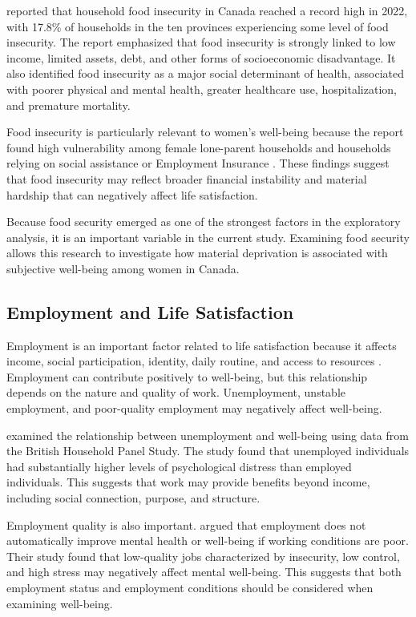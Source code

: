 \documentclass[12pt]{article}
\begin{document}
\citet{tarasuk2023} reported that household food insecurity in Canada reached a record high in 2022, with 17.8\% of households in the ten provinces experiencing some level of food insecurity. The report emphasized that food insecurity is strongly linked to low income, limited assets, debt, and other forms of socioeconomic disadvantage. It also identified food insecurity as a major social determinant of health, associated with poorer physical and mental health, greater healthcare use, hospitalization, and premature mortality.

Food insecurity is particularly relevant to women’s well-being because the report found high vulnerability among female lone-parent households and households relying on social assistance or Employment Insurance \citep{tarasuk2023}. These findings suggest that food insecurity may reflect broader financial instability and material hardship that can negatively affect life satisfaction.

Because food security emerged as one of the strongest factors in the exploratory analysis, it is an important variable in the current study. Examining food security allows this research to investigate how material deprivation is associated with subjective well-being among women in Canada.


\subsection{Employment and Life Satisfaction}

Employment is an important factor related to life satisfaction because it affects income, social participation, identity, daily routine, and access to resources \citep{clark1994, butterworth2011}. Employment can contribute positively to well-being, but this relationship depends on the nature and quality of work. Unemployment, unstable employment, and poor-quality employment may negatively affect well-being.

\citet{clark1994} examined the relationship between unemployment and well-being using data from the British Household Panel Study. The study found that unemployed individuals had substantially higher levels of psychological distress than employed individuals. This suggests that work may provide benefits beyond income, including social connection, purpose, and structure.

Employment quality is also important. \citet{butterworth2011} argued that employment does not automatically improve mental health or well-being if working conditions are poor. Their study found that low-quality jobs characterized by insecurity, low control, and high stress may negatively affect mental well-being. This suggests that both employment status and employment conditions should be considered when examining well-being.
\end{document}
